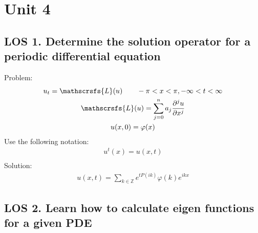 \documentclass[12pt, a4paper]{article}
\begin{document}
\section*{Unit 4}
\vspace{1em}

\subsection*{LOS 1. Determine the solution operator for a periodic differential equation}
\vspace{0.3em}
Problem:
\begin{gather*}
    u_t = \mathscrsfs{L}(u) \qquad -\pi<x<\pi, -\infty<t<\infty\\
    \mathscrsfs{L}(u)= \sum_{j=0}^{n} a_j \frac{\partial^j u}{\partial x^j}\\
    u(x, 0) = \varphi(x)\\
\end{gather*}
Use the following notation:
\begin{gather*}
    u^t(x) = u(x, t) \\
\end{gather*}
Solution:
\begin{gather*}
    u(x, t) = \sum_{k \in \mathbb{Z}} e^{tP(ik)}\hat{\varphi}(k)e^{ikx}
\end{gather*}

\subsection*{LOS 2. Learn how to calculate eigen functions for a given PDE}
\end{document}
